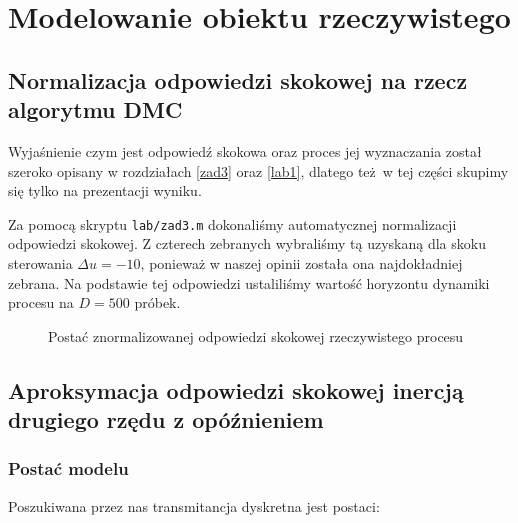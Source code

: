 \chapter{Modelowanie obiektu rzeczywistego}
\label{lab3}

\section{Normalizacja odpowiedzi skokowej na rzecz algorytmu DMC}
\label{lab3_norm}
Wyjaśnienie czym jest odpowiedź skokowa oraz proces jej wyznaczania został 
szeroko opisany w rozdziałach \ref{zad3} oraz \ref{lab1}, dlatego też w tej części 
skupimy się tylko na prezentacji wyniku.

Za pomocą skryptu \verb+lab/zad3.m+ dokonaliśmy automatycznej normalizacji odpowiedzi skokowej.
Z czterech zebranych wybraliśmy tą uzyskaną dla skoku sterowania $\Delta u = \num{-10}$, ponieważ 
w naszej opinii została ona najdokładniej zebrana. Na podstawie tej odpowiedzi ustaliliśmy wartość
horyzontu dynamiki procesu na $D = \num{500}$ próbek.

\begin{figure}[b]
    \label{zad3_norm_odp}
    \centering
    \caption{Postać znormalizowanej odpowiedzi skokowej rzeczywistego procesu}
\end{figure}
\FloatBarrier

\section{Aproksymacja odpowiedzi skokowej inercją drugiego rzędu z opóźnieniem}
\label{lab3_modelowanie}

\subsection{Postać modelu}
\label{lab3_postac_modelu}
Poszukiwana przez nas transmitancja dyskretna jest postaci:

